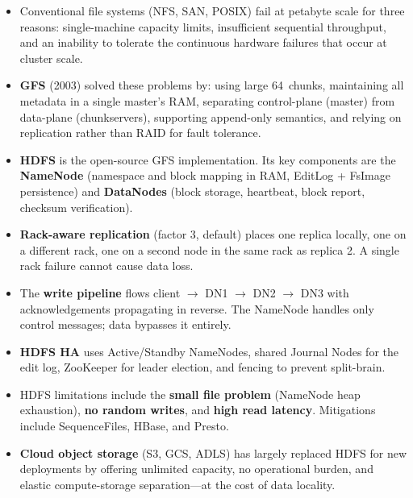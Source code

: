 \begin{itemize}
  \item Conventional file systems (NFS, SAN, POSIX) fail at petabyte
        scale for three reasons: single-machine capacity limits,
        insufficient sequential throughput, and an inability to tolerate
        the continuous hardware failures that occur at cluster scale.

  \item \textbf{GFS} (2003) solved these problems by: using large 64\MB\
        chunks, maintaining all metadata in a single master's RAM,
        separating control-plane (master) from data-plane (chunkservers),
        supporting append-only semantics, and relying on replication
        rather than RAID for fault tolerance.

  \item \textbf{HDFS} is the open-source GFS implementation. Its key
        components are the \textbf{NameNode} (namespace and block mapping
        in RAM, EditLog + FsImage persistence) and \textbf{DataNodes}
        (block storage, heartbeat, block report, checksum verification).

  \item \textbf{Rack-aware replication} (factor 3, default) places one
        replica locally, one on a different rack, one on a second node in
        the same rack as replica 2. A single rack failure cannot cause
        data loss.

  \item The \textbf{write pipeline} flows client $\to$ DN1 $\to$ DN2
        $\to$ DN3 with acknowledgements propagating in reverse. The
        NameNode handles only control messages; data bypasses it entirely.

  \item \textbf{HDFS HA} uses Active/Standby NameNodes, shared Journal
        Nodes for the edit log, ZooKeeper for leader election, and
        fencing to prevent split-brain.

  \item HDFS limitations include the \textbf{small file problem}
        (NameNode heap exhaustion), \textbf{no random writes}, and
        \textbf{high read latency}. Mitigations include SequenceFiles,
        HBase, and Presto.

  \item \textbf{Cloud object storage} (S3, GCS, ADLS) has largely
        replaced HDFS for new deployments by offering unlimited capacity,
        no operational burden, and elastic compute-storage separation---at
        the cost of data locality.
\end{itemize}

